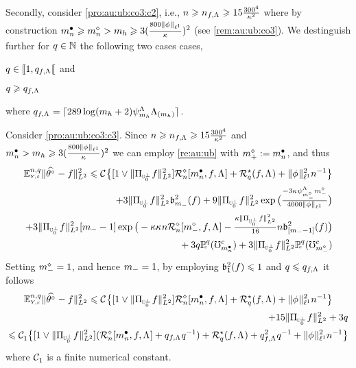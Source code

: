 \begin{pro}
Secondly, consider \ref{pro:au:ub:co3:c2}, i.e., 
$\ssY\geq\ssY_{\xdf,\iSv}\geq 15\tfrac{300^4}{\cpen^2}$ where by construction $\sDi{\ssY}\geq\aDi{\ssY}>
\Di_{\ydf}\geq 3(\tfrac{800\Vnormlp[1]{\fydf}}{\cpen})^2$ (see \cref{rem:au:ub:co3}).
We destinguish further for $\ssE\in\Nz$ the following two cases
cases, \begin{inparaenum}[i]\renewcommand{\theenumi}{\dgrau\rm(b-\roman{enumi})}\item\label{pro:au:ub:co3:c3}
$\ssE\in\nsetro{1,\ssE_{\xdf,\iSv}}$ and \item\label{pro:au:ub:co3:c4}
$\ssE\geq\ssE_{\xdf,\iSv}$ \end{inparaenum}
where $\ssE_{\xdf,\iSv}=\ceil{289\log(\Di_{\ydf}+2)\cmiSv[\Di_{\ydf}]\miSv[\Di_{\ydf}]}$.

Consider \ref{pro:au:ub:co3:c3}. Since $\ssY\geq\ssY_{\xdf,\iSv}\geq 15\tfrac{300^4}{\cpen^2}$ and $\sDi{\ssY}>\Di_{\ydf}\geq 3(\tfrac{800\Vnormlp[1]{\fydf}}{\cpen})^2$
we can employ \cref{re:au:ub} with $\pdDi:=\sDi{\ssY}$, and thus 
\begin{multline*}
\FuEx[\ssY,\ssE]{\rY,\rE}\VnormLp{\hxdfPr[]-\xdf}^2\leq\cst{}\big\{[1\vee\VnormLp{\Proj[{\mHiH[0]^\perp}]\xdf}^2]\hRaDi{\sDi{\ssY},\xdf,\iSv}+\mRa{\xdf,\iSv}+\Vnormlp[1]{\fydf}^2\ssY^{-1}\big\}
\\
\hfill+3\VnormLp{\Proj[{\mHiH[0]^\perp}]\xdf}^2\bias[\mDi]^2(\xdf)+9
\VnormLp{\Proj[{\mHiH[0]^\perp}]\xdf}^2\exp\big(\tfrac{-3\cpen\cmiSv[\mdDi]\mdDi}{4000\Vnormlp[1]{\fydf}}\big)
\\\hfill
+3
\VnormLp{\Proj[{\mHiH[0]^\perp}]\xdf}^2[\mDi-1]\exp\big(-\rWc\cpen\ssY\hRaDi{\mdDi,\xdf,\iSv}-
\tfrac{\rWc\VnormLp{\Proj[{\mHiH[0]^\perp}]\xdf}^2}{16}\ssY\bias[{[\mDi-1]}]^2(\xdf)\big)\\\null\hfill
+3\ssE\FuVg[\ssE]{\rE}(\aixEv[\sDi{\ssY}]^c)+3
\VnormLp{\Proj[{\mHiH[0]^\perp}]\xdf}^2\FuVg[\ssE]{\rE}(\aixEv[\mdDi]^c)
  \end{multline*}
Setting $\mdDi=1$, and hence $\mDi=1$, by employing  $\bias[1]^2(\xdf)\leq1$
and $\ssE\leq\ssE_{\xdf,\iSv}$ it follows
\begin{multline}\label{pro:au:ub:co3:e2}
\FuEx[\ssY,\ssE]{\rY,\rE}\VnormLp{\hxdfPr[]-\xdf}^2\leq\cst{}\big\{[1\vee\VnormLp{\Proj[{\mHiH[0]^\perp}]\xdf}^2]\hRaDi{\sDi{\ssY},\xdf,\iSv}+\mRa{\xdf,\iSv}+\Vnormlp[1]{\fydf}^2\ssY^{-1}\big\}
\\\hfill
+15\VnormLp{\Proj[{\mHiH[0]^\perp}]\xdf}^2+3\ssE\\
\leq\cst{1}\big\{[1\vee\VnormLp{\Proj[{\mHiH[0]^\perp}]\xdf}^2](\hRaDi{\sDi{\ssY},\xdf,\iSv}+\ssE_{\xdf,\iSv}\ssE^{-1})+\mRa{\xdf,\iSv}+\ssE_{\xdf,\iSv}^2\ssE^{-1}+\Vnormlp[1]{\fydf}^2\ssY^{-1}\big\}
  \end{multline}
where $\cst{1}$ is a finite numerical constant.


\end{pro}
